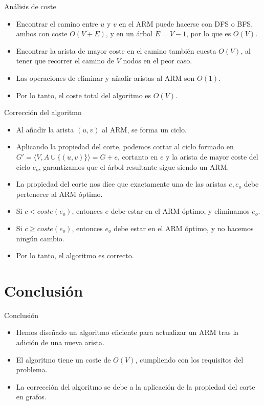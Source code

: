 \documentclass[aspectratio=169]{beamer}
\begin{document}
\begin{frame}{Análisis de coste}
    \begin{itemize}
        \item Encontrar el camino entre $u$ y $v$ en el ARM puede hacerse con DFS o BFS, ambos con coste $O(V + E)$, y en un árbol $E = V - 1$, por lo que es $O(V)$.
        \item Encontrar la arista de mayor coste en el camino también cuesta $O(V)$, al tener que recorrer el camino de $V$ nodos en el peor caso.
        \item Las operaciones de eliminar y añadir aristas al ARM son $O(1)$.
        \item Por lo tanto, el coste total del algoritmo es $O(V)$.
    \end{itemize}
\end{frame}

\begin{frame}{Corrección del algoritmo}
    \begin{itemize}
        \item Al añadir la arista $(u, v)$ al ARM, se forma un ciclo.
        \item Aplicando la propiedad del corte, podemos cortar al ciclo formado en $G'=⟨V, A \cup \{(u, v)\}⟩ = G + e$, cortanto en $e$ y la arista de mayor coste del ciclo $e_o$, garantizamos que el árbol resultante sigue siendo un ARM.
        \item La propiedad del corte nos dice que exactamente una de las aristas $e, e_o$ debe pertenecer al ARM óptimo.
        \item Si $c < coste(e_o)$, entonces $e$ debe estar en el ARM óptimo, y eliminamos $e_o$.
        \item Si $c \geq coste(e_o)$, entonces $e_o$ debe estar en el ARM óptimo, y no hacemos ningún cambio.
        \item Por lo tanto, el algoritmo es correcto.
    \end{itemize}
\end{frame}

\section{Conclusión}
\begin{frame}{Conclusión}
    \begin{itemize}
        \item Hemos diseñado un algoritmo eficiente para actualizar un ARM tras la adición de una nueva arista.
        \item El algoritmo tiene un coste de $O(V)$, cumpliendo con los requisitos del problema.
        \item La corrección del algoritmo se debe a la aplicación de la propiedad del corte en grafos.
    \end{itemize}
\end{frame}
\end{document}
